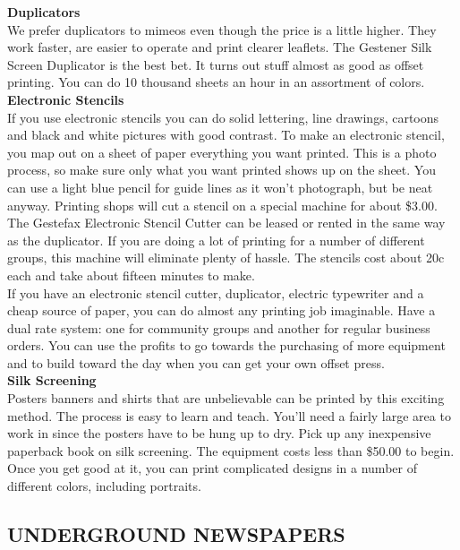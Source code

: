 \documentclass[11pt,twoside,a4paper]{book}
\begin{document}
\textbf{Duplicators}~\\
We prefer duplicators to mimeos even though the price is a little higher. They work faster, are easier to operate and print clearer leaflets. The Gestener Silk Screen Duplicator is the best bet. It turns out stuff almost as good as offset printing. You can do 10 thousand sheets an hour in an assortment of colors.~\\

\textbf{Electronic Stencils}~\\
If you use electronic stencils you can do solid lettering, line drawings, cartoons and black and white pictures with good contrast. To make an electronic stencil, you map out on a sheet of paper everything you want printed. This is a photo process, so make sure only what you want printed shows up on the sheet. You can use a light blue pencil for guide lines as it won't photograph, but be neat anyway. Printing shops will cut a stencil on a special machine for about \$3.00.~\\

The Gestefax Electronic Stencil Cutter can be leased or rented in the same way as the duplicator. If you are doing a lot of printing for a number of different groups, this machine will eliminate plenty of hassle. The stencils cost about 20c each and take about fifteen minutes to make.~\\

If you have an electronic stencil cutter, duplicator, electric typewriter and a cheap source of paper, you can do almost any printing job imaginable. Have a dual rate system: one for community groups and another for regular business orders. You can use the profits to go towards the purchasing of more equipment and to build toward the day when you can get your own offset press.~\\

\textbf{Silk Screening}~\\
Posters banners and shirts that are unbelievable can be printed by this exciting method. The process is easy to learn and teach. You'll need a fairly large area to work in since the posters have to be hung up to dry. Pick up any inexpensive paperback book on silk screening. The equipment costs less than \$50.00 to begin. Once you get good at it, you can print complicated designs in a number of different colors, including portraits.~\\

\subsection{UNDERGROUND NEWSPAPERS}
\end{document}
